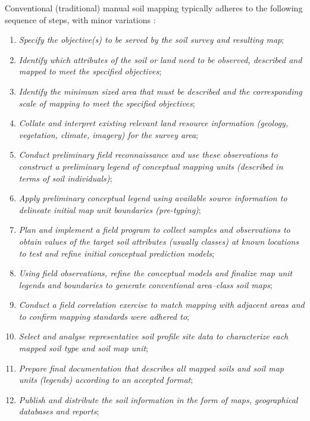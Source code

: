 \documentclass[graybox,natbib,nospthms,UStrade]{svmono}
\begin{document}
Conventional (traditional) manual soil mapping typically adheres to the
following sequence of steps, with minor variations
\citep{McBratney2003Geoderma}:

\begin{enumerate}
\def\labelenumi{\arabic{enumi}.}
\item
  \emph{Specify the objective(s) to be served by the soil survey and
  resulting map};
\item
  \emph{Identify which attributes of the soil or land need to be observed,
  described and mapped to meet the specified objectives};
\item
  \emph{Identify the minimum sized area that must be described and the
  corresponding scale of mapping to meet the specified objectives};
\item
  \emph{Collate and interpret existing relevant land resource information
  (geology, vegetation, climate, imagery) for the survey area};
\item
  \emph{Conduct preliminary field reconnaissance and use these observations
  to construct a preliminary legend of conceptual mapping units
  (described in terms of soil individuals)};
\item
  \emph{Apply preliminary conceptual legend using available source
  information to delineate initial map unit boundaries (pre-typing)};
\item
  \emph{Plan and implement a field program to collect samples and
  observations to obtain values of the target soil attributes
  (usually classes) at known locations to test and refine initial
  conceptual prediction models};
\item
  \emph{Using field observations, refine the conceptual models and finalize
  map unit legends and boundaries to generate conventional area--class
  soil maps};
\item
  \emph{Conduct a field correlation exercise to match mapping with adjacent
  areas and to confirm mapping standards were adhered to};
\item
  \emph{Select and analyse representative soil profile site data to
  characterize each mapped soil type and soil map unit};
\item
  \emph{Prepare final documentation that describes all mapped soils and
  soil map units (legends) according to an accepted format};
\item
  \emph{Publish and distribute the soil information in the form of maps,
  geographical databases and reports};
\end{enumerate}
\end{document}
